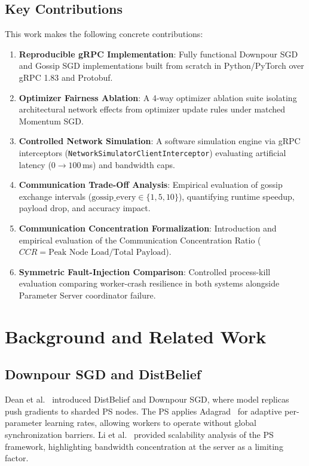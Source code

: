 \documentclass[conference]{IEEEtran}
\begin{document}
\subsection{Key Contributions}
This work makes the following concrete contributions:
\begin{enumerate}
    \item \textbf{Reproducible gRPC Implementation}: Fully functional Downpour SGD and Gossip SGD implementations built from scratch in Python/PyTorch over gRPC 1.83 and Protobuf.
    \item \textbf{Optimizer Fairness Ablation}: A 4-way optimizer ablation suite isolating architectural network effects from optimizer update rules under matched Momentum SGD.
    \item \textbf{Controlled Network Simulation}: A software simulation engine via gRPC interceptors (\texttt{NetworkSimulatorClientInterceptor}) evaluating artificial latency ($0\to 100$\,ms) and bandwidth caps.
    \item \textbf{Communication Trade-Off Analysis}: Empirical evaluation of gossip exchange intervals ($\text{gossip\_every} \in \{1, 5, 10\}$), quantifying runtime speedup, payload drop, and accuracy impact.
    \item \textbf{Communication Concentration Formalization}: Introduction and empirical evaluation of the Communication Concentration Ratio ($CCR = \text{Peak Node Load} / \text{Total Payload}$).
    \item \textbf{Symmetric Fault-Injection Comparison}: Controlled process-kill evaluation comparing worker-crash resilience in both systems alongside Parameter Server coordinator failure.
\end{enumerate}

\section{Background and Related Work}

\subsection{Downpour SGD and DistBelief}
Dean et al.~\cite{dean2012large} introduced DistBelief and Downpour SGD, where model replicas push gradients to sharded PS nodes. The PS applies Adagrad~\cite{duchi2011adaptive} for adaptive per-parameter learning rates, allowing workers to operate without global synchronization barriers. Li et al.~\cite{li2014scaling} provided scalability analysis of the PS framework, highlighting bandwidth concentration at the server as a limiting factor.
\end{document}
